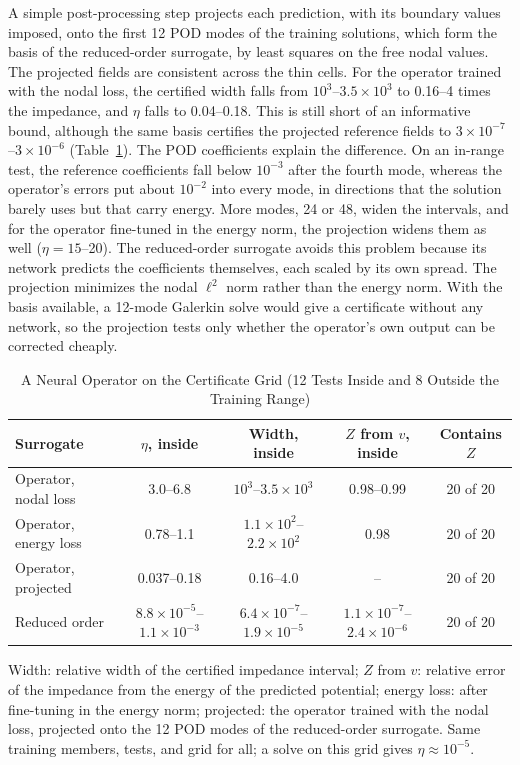 \documentclass[11pt]{article}
\begin{document}
A simple post-processing step projects each prediction, with its boundary values
imposed, onto the
first 12 POD modes of the training solutions, which form the basis of the
reduced-order surrogate, by least squares on the free nodal values. The projected
fields are consistent across the thin cells. For the operator trained with the nodal
loss, the certified width falls from $10^3$--$3.5\times10^3$ to 0.16--4 times the
impedance, and $\eta$ falls to 0.04--0.18. This is still short of an informative
bound, although the same basis certifies the projected reference fields to
$3\times10^{-7}$--$3\times10^{-6}$ (Table~\ref{tab:fno-grid}). The POD coefficients
explain the difference. On an in-range test, the reference coefficients fall below
$10^{-3}$ after the fourth mode, whereas the operator's errors put about $10^{-2}$
into every mode, in directions that the solution barely uses but that carry energy.
More modes, 24 or 48, widen the intervals, and for the operator fine-tuned in the
energy norm, the projection widens them as well ($\eta=15$--20). The reduced-order
surrogate avoids this problem because its network predicts the coefficients
themselves, each scaled by its own spread. The projection minimizes the nodal
$\ell^2$ norm rather than the energy norm. With the basis available, a 12-mode
Galerkin solve would give a certificate without any network, so the projection tests
only whether the operator's own output can be corrected cheaply.

\begin{table}[t]
\centering
\caption{A Neural Operator on the Certificate Grid (12 Tests Inside and 8 Outside the Training Range)}\label{tab:fno-grid}
\footnotesize\setlength{\tabcolsep}{3pt}
\begin{tabular}{lcccc}
\toprule
Surrogate & $\eta$, inside & Width, inside & $Z$ from $v$, inside & Contains $Z$\\
\midrule
Operator, nodal loss & 3.0--6.8 & $10^3$--$3.5\times10^3$ & 0.98--0.99 & 20 of 20\\
Operator, energy loss & 0.78--1.1 & $1.1\times10^2$--$2.2\times10^2$ & 0.98 & 20 of 20\\
Operator, projected & 0.037--0.18 & 0.16--4.0 & -- & 20 of 20\\
Reduced order & $8.8\times10^{-5}$--$1.1\times10^{-3}$ & $6.4\times10^{-7}$--$1.9\times10^{-5}$ & $1.1\times10^{-7}$--$2.4\times10^{-6}$ & 20 of 20\\
\bottomrule
\end{tabular}
\par\vspace{2pt}\footnotesize\raggedright Width: relative width of the certified impedance interval; $Z$ from $v$: relative error of the impedance from the energy of the predicted potential; energy loss: after fine-tuning in the energy norm; projected: the operator trained with the nodal loss, projected onto the 12 POD modes of the reduced-order surrogate. Same training members, tests, and grid for all; a solve on this grid gives $\eta\approx10^{-5}$.
\end{table}
\end{document}

